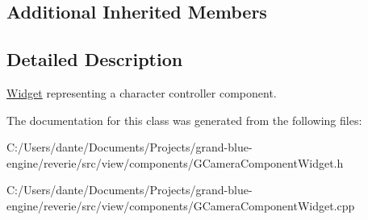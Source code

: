 \subsection*{Additional Inherited Members}


\subsection{Detailed Description}
\mbox{\hyperlink{class_widget}{Widget}} representing a character controller component. 

The documentation for this class was generated from the following files\+:\begin{DoxyCompactItemize}
\item 
C\+:/\+Users/dante/\+Documents/\+Projects/grand-\/blue-\/engine/reverie/src/view/components/G\+Camera\+Component\+Widget.\+h\item 
C\+:/\+Users/dante/\+Documents/\+Projects/grand-\/blue-\/engine/reverie/src/view/components/G\+Camera\+Component\+Widget.\+cpp\end{DoxyCompactItemize}
